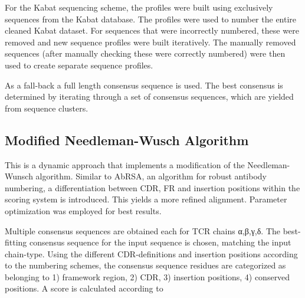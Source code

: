 For the Kabat sequencing scheme, the profiles were built using exclusively sequences from the Kabat database. The profiles were used to number the entire cleaned Kabat dataset. For sequences that were incorrectly numbered, these were removed and new sequence profiles were built iteratively.
The manually removed sequences (after manually checking these were correctly numbered) were then used to create separate sequence profiles. 

As a fall-back a full length consensus sequence is used. The best consensus is determined by iterating through a set of consensus sequences, which are yielded from sequence clusters. 

\subsection{Modified Needleman-Wusch Algorithm}
This is a dynamic approach that implements a modification of the Needleman-Wunsch algorithm. 
Similar to AbRSA\cite{Li2019}, an algorithm for robust antibody numbering, a differentiation between CDR, 
FR and insertion positions within the scoring system is introduced. This yields a more refined alignment. 
Parameter optimization was employed for best results.

Multiple consensus sequences are obtained each for TCR chains α,β,γ,δ. The best-fitting consensus sequence for the input sequence is chosen, matching the input chain-type. Using the different CDR-definitions and insertion positions according to the numbering schemes, the consensus sequence residues are categorized as belonging to 1) framework region, 2) CDR, 3) insertion positions, 4) conserved positions. A score is calculated according to



